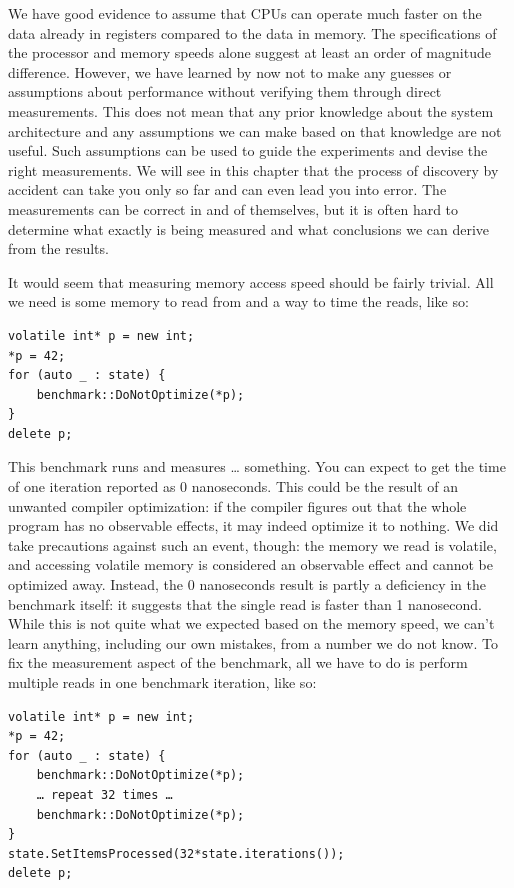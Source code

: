 
We have good evidence to assume that CPUs can operate much faster on the data already in registers compared to the data in memory. The specifications of the processor and memory speeds alone suggest at least an order of magnitude difference. However, we have learned by now not to make any guesses or assumptions about performance without verifying them through direct measurements. This does not mean that any prior knowledge about the system architecture and any assumptions we can make based on that knowledge are not useful. Such assumptions can be used to guide the experiments and devise the right measurements. We will see in this chapter that the process of discovery by accident can take you only so far and can even lead you into error. The measurements can be correct in and of themselves, but it is often hard to determine what exactly is being measured and what conclusions we can derive from the results.

It would seem that measuring memory access speed should be fairly trivial. All we need is some memory to read from and a way to time the reads, like so:

\begin{lstlisting}[style=styleCXX]
volatile int* p = new int;
*p = 42;
for (auto _ : state) {
	benchmark::DoNotOptimize(*p);
}
delete p;
\end{lstlisting}

This benchmark runs and measures … something. You can expect to get the time of one iteration reported as 0 nanoseconds. This could be the result of an unwanted compiler optimization: if the compiler figures out that the whole program has no observable effects, it may indeed optimize it to nothing. We did take precautions against such an event, though: the memory we read is volatile, and accessing volatile memory is considered an observable effect and cannot be optimized away. Instead, the 0 nanoseconds result is partly a deficiency in the benchmark itself: it suggests that the single read is faster than 1 nanosecond. While this is not quite what we expected based on the memory speed, we can't learn anything, including our own mistakes, from a number we do not know. To fix the measurement aspect of the benchmark, all we have to do is perform multiple reads in one benchmark iteration, like so:

\begin{lstlisting}[style=styleCXX]
volatile int* p = new int;
*p = 42;
for (auto _ : state) {
	benchmark::DoNotOptimize(*p);
	… repeat 32 times …
	benchmark::DoNotOptimize(*p);
}
state.SetItemsProcessed(32*state.iterations());
delete p;
\end{lstlisting}

